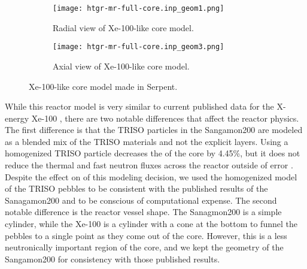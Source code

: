 \begin{figure}[ht]
    \centering 
    \begin{subfigure}{0.45\textwidth}
        \centering 
        \texttt{[image: htgr-mr-full-core.inp\_geom1.png]}
        \caption{Radial view of Xe-100-like core model.}
        \label{fig:xe100_core_radial}        
    \end{subfigure}
    \hfill
    \begin{subfigure}{0.45\textwidth}
        \centering 
        \texttt{[image: htgr-mr-full-core.inp\_geom3.png]}
        \caption{Axial view of Xe-100-like core model.}
        \label{fig:xe100_core_axial}        
    \end{subfigure}
    \caption{Xe-100-like core model made in Serpent.}
    \label{fig:xe100_core}
\end{figure}
While this reactor model 
is very similar to current published data for the X-energy Xe-100
\cite{mulder_overview_2021}, there are two notable differences that affect 
the reactor physics. The first difference is that the \gls{TRISO} particles 
in the Sangamon200 are modeled as a blended mix of the \gls{TRISO} 
materials and not the explicit layers. Using a homogenized \gls{TRISO} particle 
decreases the \keff of the core by 4.45\%, but it does not reduce the 
thermal and fast neutron fluxes across the reactor outside of error 
\cite{richter_isotopic_2022}. Despite 
the effect on \keff of this modeling decision, we used the 
homogenized model of the \gls{TRISO} pebbles to be consistent with the 
published results of the Sanagamon200 \cite{richter_isotopic_2022} and 
to be conscious of computational expense. 
The second 
notable difference is the reactor vessel shape. The Sanagmon200 is a simple 
cylinder, while the Xe-100 is a cylinder with a cone at the bottom to funnel 
the pebbles to a single point as they come out of the core. However, 
this is a less neutronically important region of the core, and we kept the 
geometry of the Sangamon200 for consistency with those published results. 

